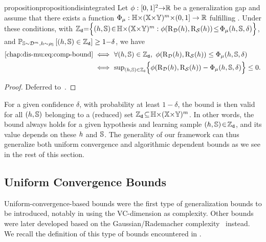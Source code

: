 \begin{restatable}{proposition}{propositiondisintegrated}\label{chap:dis-mu:proposition:disintegrated}
Let $\phi: [0,1]^2{\to}\Rbb$ be a generalization gap and assume that there exists a function $\PhiComp: \H{\times}(\X{\times}\Y)^\m{\times}(0,1]\to\Rbb$ fulfilling .
Under these conditions, with $\setD {=} \Big\{ (\h, \S)\!\in\! \H{\times}(\X{\times}\Y)^\m :  \phi(\Risk_{\D}(\h), \Risk_{\dS}(\h))\!\le\!\PhiComp(\h, \S, \delta) \Big\}$, and  $\PP_{\S\sim\D^\m, h\sim\AQ}\LB (\h, \S)\in\setD \RB\ge  1{-}\delta$, we have
\begin{align*}
    \text{\Cref{chap:dis-mu:eq:comp-bound}} \iff\ &\forall (\h, \S)\in \setD,\  \phi(\Risk_{\D}(\h), \Risk_{\dS}(\h)) \le \PhiComp(\h, \S, \delta)\\
 \iff\ &  {\textstyle\sup_{(\h, \S)\in \setD}} \Big\{\phi(\Risk_{\D}(\h), \Risk_{\dS}(\h)) - \PhiComp(\h, \S, \delta) \Big\} \le 0.
\end{align*}
\end{restatable}
\begin{noaddcontents}\begin{proof}
Deferred to~.
\end{proof}\end{noaddcontents}
For a given confidence $\delta$, with probability at least $1{-}\delta$,
the bound is then valid for all $(\h, \S)$ belonging to a (reduced) set $\setD \!\subseteq\! \H{\times}(\X{\times}\Y)^\m$.
In other words, the bound always holds for a given hypothesis and learning sample $(\h, \S)\!\in\!\setD$, and its value depends on these $\h$ and $\S$.  
The generality of our framework can thus generalize both uniform convergence and algorithmic dependent bounds as we see in the rest of this section. 

\subsection{Uniform Convergence Bounds}

Uniform-convergence-based bounds were the first type of generalization bounds to be introduced, notably in \citet{VapnikChervonenkis1971} using the VC-dimension as complexity.
Other bounds were later developed based on the Gaussian/Rademacher complexity~\citep{BartlettMendelson2002} instead.
We recall the definition of this type of bounds encountered in .

